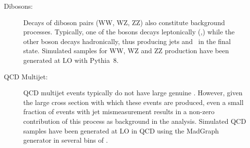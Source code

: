 \begin{description}
\item[Dibosons:] Decays of diboson pairs (WW, WZ, ZZ) also constitute background processes.
Typically, one of the bosons decays leptonically (\Wlv,\Zvv) while the other boson decays hadronically, thus producing jets and \ptmiss~in the final state.
Simulated samples for WW, WZ and ZZ production have been generated at LO with Pythia~8.

\item[QCD Multijet:] QCD multijet events typically do not have large genuine \ptmiss.
However, given the large cross section with which these events are produced, even a small fraction of events with
jet mismeasurement results in a non-zero contribution of this process as background in the analysis.
Simulated QCD samples have been generated at LO in QCD using the MadGraph generator in several bins of \Ht.

\end{description}


